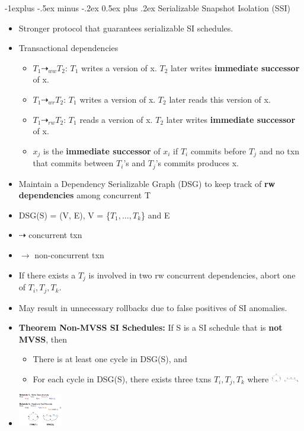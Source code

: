 \documentclass[9pt, landscape]{extarticle}
\makeatletter
\renewcommand{\subsection}{\@startsection{subsection}{2}{0mm}%
  {-1explus -.5ex minus -.2ex}%
  {0.5ex plus .2ex}%
{\normalfont\normalsize\bfseries}}
\makeatother
\begin{document}
\begin{multicols*}{4}
  \subsection{Serializable Snapshot Isolation (SSI)}
  \begin{itemize}
    \item Stronger protocol that guarantees serializable SI schedules.
    \item Transactional dependencies
    \begin{itemize}
      \item $T_1 \dashrightarrow_{ww} T_2$: $T_1$ writes a version of x. $T_2$ later writes \textbf{immediate successor} of x.
      \item $T_1 \dashrightarrow_{wr} T_2$: $T_1$ writes a version of x. $T_2$ later reads this version of x.
      \item $T_1 \dashrightarrow_{rw} T_2$: $T_1$ reads a version of x. $T_2$ later writes \textbf{immediate successor} of x.
      \item $x_j$ is the \textbf{immediate successor} of $x_i$ if $T_i$ commits before $T_j$ and no txn that commits between $T_i$'s and $T_j$'s commits produces x.
    \end{itemize}
    \item Maintain a Dependency Serializable Graph (DSG) to keep track of \textbf{rw dependencies} among concurrent T
    \item DSG(S) = (V, E), V = \{$T_1, \dots, T_k$\} and E
    \item $\dashrightarrow$ concurrent txn
    \item $\rightarrow$ non-concurrent txn
    \item If there exists a $T_j$ is involved in two rw concurrent dependencies, abort one of $T_i, T_j, T_k$.
    \item May result in unnecessary rollbacks due to false positives of SI anomalies.
    \item \textbf{Theorem Non-MVSS SI Schedules:} If S is a SI schedule that is \textbf{not MVSS}, then
    \begin{itemize}
      \item There is at least one cycle in DSG(S), and
      \item For each cycle in DSG(S), there exists three txns $T_i, T_j, T_k$ where
      \includegraphics[width=0.1\textwidth]{cs3223-ssi-theorem.png}
    \end{itemize}
    \item \includegraphics[width=0.15\textwidth, height=0.15\textheight]{cs3223-si-anomalies-revisited.png}
  \end{itemize}


\end{multicols*}
\end{document}
